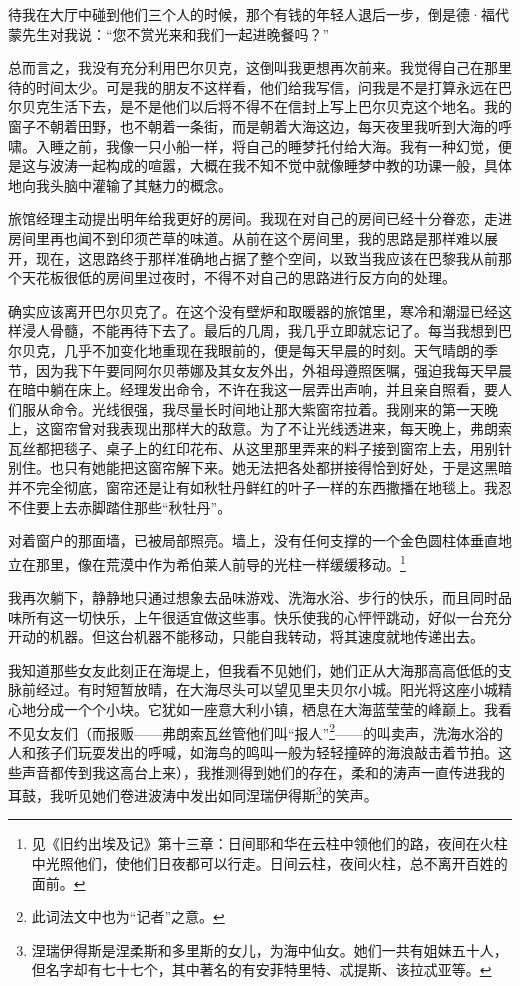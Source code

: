 \par 待我在大厅中碰到他们三个人的时候，那个有钱的年轻人退后一步，倒是德·福代蒙先生对我说：“您不赏光来和我们一起进晚餐吗？”
\par 总而言之，我没有充分利用巴尔贝克，这倒叫我更想再次前来。我觉得自己在那里待的时间太少。可是我的朋友不这样看，他们给我写信，问我是不是打算永远在巴尔贝克生活下去，是不是他们以后将不得不在信封上写上巴尔贝克这个地名。我的窗子不朝着田野，也不朝着一条街，而是朝着大海这边，每天夜里我听到大海的呼啸。入睡之前，我像一只小船一样，将自己的睡梦托付给大海。我有一种幻觉，便是这与波涛一起构成的喧嚣，大概在我不知不觉中就像睡梦中教的功课一般，具体地向我头脑中灌输了其魅力的概念。
\par 旅馆经理主动提出明年给我更好的房间。我现在对自己的房间已经十分眷恋，走进房间里再也闻不到印须芒草的味道。从前在这个房间里，我的思路是那样难以展开，现在，这思路终于那样准确地占据了整个空间，以致当我应该在巴黎我从前那个天花板很低的房间里过夜时，不得不对自己的思路进行反方向的处理。
\par 确实应该离开巴尔贝克了。在这个没有壁炉和取暖器的旅馆里，寒冷和潮湿已经这样浸人骨髓，不能再待下去了。最后的几周，我几乎立即就忘记了。每当我想到巴尔贝克，几乎不加变化地重现在我眼前的，便是每天早晨的时刻。天气晴朗的季节，因为我下午要同阿尔贝蒂娜及其女友外出，外祖母遵照医嘱，强迫我每天早晨在暗中躺在床上。经理发出命令，不许在我这一层弄出声响，并且亲自照看，要人们服从命令。光线很强，我尽量长时间地让那大紫窗帘拉着。我刚来的第一天晚上，这窗帘曾对我表现出那样大的敌意。为了不让光线透进来，每天晚上，弗朗索瓦丝都把毯子、桌子上的红印花布、从这里那里弄来的料子接到窗帘上去，用别针别住。也只有她能把这窗帘解下来。她无法把各处都拼接得恰到好处，于是这黑暗并不完全彻底，窗帘还是让有如秋牡丹鲜红的叶子一样的东西撒播在地毯上。我忍不住要上去赤脚踏住那些“秋牡丹”。
\par 对着窗户的那面墙，已被局部照亮。墙上，没有任何支撑的一个金色圆柱体垂直地立在那里，像在荒漠中作为希伯莱人前导的光柱一样缓缓移动。\footnote{见《旧约出埃及记》第十三章：日间耶和华在云柱中领他们的路，夜间在火柱中光照他们，使他们日夜都可以行走。日间云柱，夜间火柱，总不离开百姓的面前。}
\par 我再次躺下，静静地只通过想象去品味游戏、洗海水浴、步行的快乐，而且同时品味所有这一切快乐，上午很适宜做这些事。快乐使我的心怦怦跳动，好似一台充分开动的机器。但这台机器不能移动，只能自我转动，将其速度就地传递出去。
\par 我知道那些女友此刻正在海堤上，但我看不见她们，她们正从大海那高高低低的支脉前经过。有时短暂放晴，在大海尽头可以望见里夫贝尔小城。阳光将这座小城精心地分成一个个小块。它犹如一座意大利小镇，栖息在大海蓝莹莹的峰巅上。我看不见女友们（而报贩——弗朗索瓦丝管他们叫“报人”\footnote{此词法文中也为“记者”之意。}——的叫卖声，洗海水浴的人和孩子们玩耍发出的呼喊，如海鸟的鸣叫一般为轻轻撞碎的海浪敲击着节拍。这些声音都传到我这高台上来），我推测得到她们的存在，柔和的涛声一直传进我的耳鼓，我听见她们卷进波涛中发出如同涅瑞伊得斯\footnote{涅瑞伊得斯是涅柔斯和多里斯的女儿，为海中仙女。她们一共有姐妹五十人，但名字却有七十七个，其中著名的有安菲特里特、忒提斯、该拉忒亚等。}的笑声。
